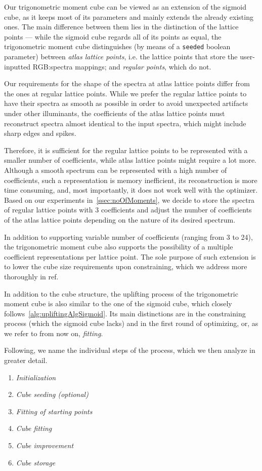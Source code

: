 Our trigonometric moment cube can be viewed as an extension of the sigmoid cube, as it keeps most of its parameters and mainly extends the already existing ones. The main difference between them lies in the distinction of the lattice points --- while the sigmoid cube regards all of its points as equal, the trigonometric moment cube distinguishes (by means of a \texttt{seeded} boolean parameter) between \emph{atlas lattice points}, i.e. the lattice points that store the user-inputted RGB:spectra mappings; and \emph{regular points}, which do not.

Our requirements for the shape of the spectra at atlas lattice points differ from the ones at regular lattice points. While we prefer the regular lattice points to have their spectra as smooth as possible in order to avoid unexpected artifacts under other illuminants, the coefficients of the atlas lattice points must reconstruct spectra almost identical to the input spectra, which might include sharp edges and spikes.

Therefore, it is sufficient for the regular lattice points to be represented with a smaller number of coefficients, while atlas lattice points might require a lot more. Although a smooth spectrum can be represented with a high number of coefficients, such a representation is memory inefficient, its reconstruction is more time consuming, and, most importantly, it does not work well with the optimizer. Based on our experiments in~\cref{ssec:noOfMoments}, we decide to store the spectra of regular lattice points with 3 coefficients and adjust the number of coefficients of the atlas lattice points depending on the nature of its desired spectrum.

In addition to supporting variable number of coefficients (ranging from 3 to 24), the trigonometric moment cube also supports the possibility of a multiple coefficient representations per lattice point. The sole purpose of such extension is to lower the cube size requirements upon constraining, which we address more thoroughly in ref.

In addition to the cube structure, the uplifting process of the trigonometric moment cube is also similar to the one of the sigmoid cube, which closely follows~\cref{alg:upliftingAlgSigmoid}. Its main distinctions are in the constraining process (which the sigmoid cube lacks) and in the first round of optimizing, or, as we refer to from now on, \emph{fitting}.

Following, we name the individual steps of the process, which we then analyze in greater detail.
\begin{enumerate}
	\item \emph{Initialization}
	\item \emph{Cube seeding (optional)}
	\item \emph{Fitting of starting points}
	\item \emph{Cube fitting}
	\item \emph{Cube improvement}
	\item \emph{Cube storage}
\end{enumerate}

